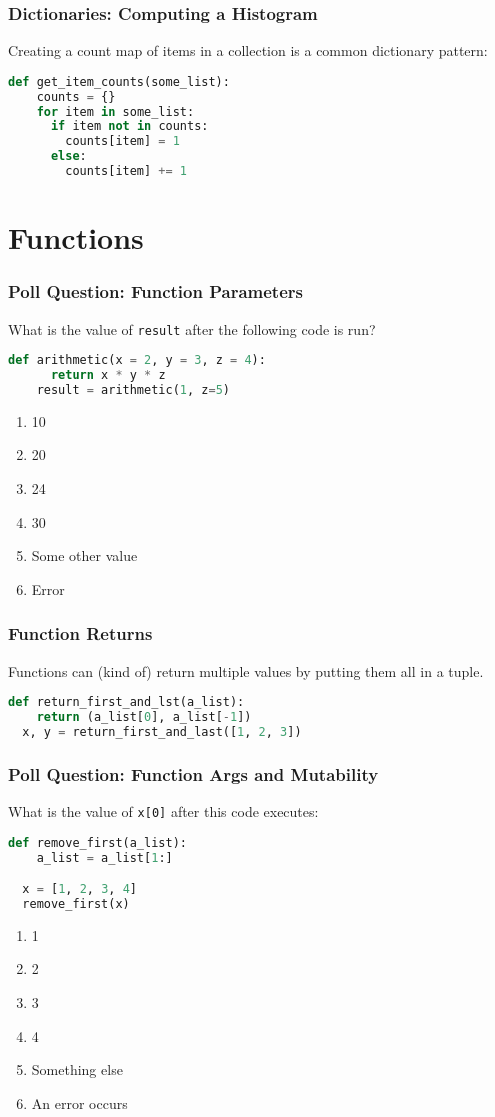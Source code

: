 \documentclass{beamer}
\begin{document}
%
%
\begin{frame}[fragile]
  \frametitle{Dictionaries: Computing a Histogram}
  Creating a count map of items in a collection is a common dictionary pattern:
  \begin{lstlisting}[language=Python, autogobble]
  def get_item_counts(some_list):
    counts = {}
    for item in some_list:
      if item not in counts:
        counts[item] = 1
      else:
        counts[item] += 1
  \end{lstlisting}
\end{frame}

\section{Functions}
%
%
\begin{frame}[fragile]
  \frametitle{Poll Question: Function Parameters}
  What is the value of \lstinline|result| after the following code is run?
  \begin{lstlisting}[language=Python, autogobble]
    def arithmetic(x = 2, y = 3, z = 4):
      return x * y * z
    result = arithmetic(1, z=5)
  \end{lstlisting}
  \vfill
  \begin{enumerate}[A]
    \item 10
    \item 20
    \item 24
    \item 30
    \item Some other value
    \item Error
  \end{enumerate}
\end{frame}

%
%
\begin{frame}[fragile]
  \frametitle{Function Returns}
  Functions can (kind of) return multiple values by putting them all in a tuple.
  \begin{lstlisting}[language=Python, autogobble]
  def return_first_and_lst(a_list):
    return (a_list[0], a_list[-1])
  x, y = return_first_and_last([1, 2, 3])
  \end{lstlisting}
\end{frame}

%
%
\begin{frame}[fragile]
  \frametitle{Poll Question: Function Args and Mutability}
  What is the value of \lstinline|x[0]| after this code executes:
  \begin{lstlisting}[language=Python, autogobble]
  def remove_first(a_list):
    a_list = a_list[1:]

  x = [1, 2, 3, 4]
  remove_first(x)
  \end{lstlisting}
  \vfill
  \begin{enumerate}[A]
    \item 1
    \item 2
    \item 3
    \item 4
    \item Something else
    \item An error occurs
  \end{enumerate}
\end{frame}
\end{document}
